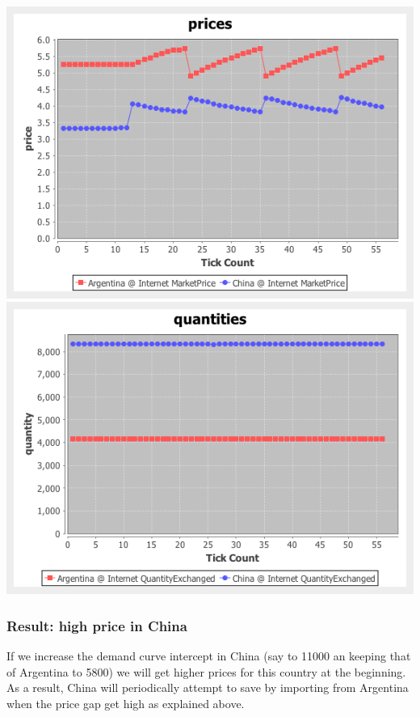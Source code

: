\documentclass{article}
\begin{document}
\vskip2mm
\hskip-2cm
\includegraphics[scale=0.4]{fig_case4_prices}
\includegraphics[scale=0.4]{fig_case4_quantities}

\subsubsection{Result: high price in China}

If we increase the demand curve intercept in China (say to 11000 an keeping that of Argentina to 5800) we will get higher prices for this country at the beginning. As a result,  China will periodically attempt to save by importing from Argentina when the price gap get high as explained above.
\end{document}
